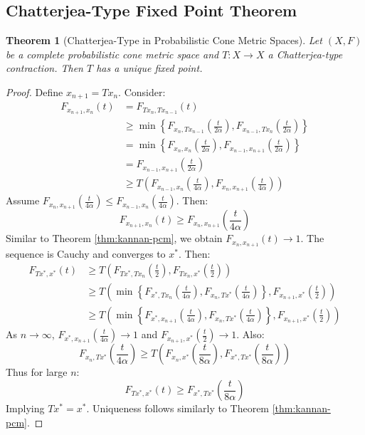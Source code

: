 \documentclass{amsart}
\newtheorem{theorem}{Theorem}[section]
\theoremstyle{definition}
\theoremstyle{remark}
\numberwithin{equation}{section}
\begin{document}
\subsection{Chatterjea-Type Fixed Point Theorem}

\begin{theorem}[Chatterjea-Type in Probabilistic Cone Metric Spaces]\label{thm:chatterjea-pcm}
Let $(X,F)$ be a complete probabilistic cone metric space and $T: X \to X$ a Chatterjea-type contraction. Then $T$ has a unique fixed point.
\end{theorem}

\begin{proof}
Define $x_{n+1} = Tx_n$. Consider:
\begin{align*}
F_{x_{n+1},x_n}(t) &= F_{Tx_n,Tx_{n-1}}(t) \\ 
&\geq \min\left\{F_{x_n,Tx_{n-1}}\left(\frac{t}{2\alpha}\right), F_{x_{n-1},Tx_n}\left(\frac{t}{2\alpha}\right)\right\} \\
&= \min\left\{F_{x_n,x_n}\left(\frac{t}{2\alpha}\right), F_{x_{n-1},x_{n+1}}\left(\frac{t}{2\alpha}\right)\right\} \\
&= F_{x_{n-1},x_{n+1}}\left(\frac{t}{2\alpha}\right) \\
&\geq T\left(F_{x_{n-1},x_n}\left(\frac{t}{4\alpha}\right), F_{x_n,x_{n+1}}\left(\frac{t}{4\alpha}\right)\right)
\end{align*}
Assume $F_{x_n,x_{n+1}}\left(\frac{t}{4\alpha}\right) \leq F_{x_{n-1},x_n}\left(\frac{t}{4\alpha}\right)$. Then:
\[
F_{x_{n+1},x_n}(t) \geq F_{x_n,x_{n+1}}\left(\frac{t}{4\alpha}\right)
\]
Similar to Theorem \ref{thm:kannan-pcm}, we obtain $F_{x_n,x_{n+1}}(t) \to 1$. The sequence is Cauchy and converges to $x^*$. Then:
\begin{align*}
F_{Tx^*,x^*}(t) &\geq T\left(F_{Tx^*,Tx_n}\left(\frac{t}{2}\right), F_{Tx_n,x^*}\left(\frac{t}{2}\right)\right) \\
&\geq T\left(\min\left\{F_{x^*,Tx_n}\left(\frac{t}{4\alpha}\right), F_{x_n,Tx^*}\left(\frac{t}{4\alpha}\right)\right\}, F_{x_{n+1},x^*}\left(\frac{t}{2}\right)\right) \\
&\geq T\left(\min\left\{F_{x^*,x_{n+1}}\left(\frac{t}{4\alpha}\right), F_{x_n,Tx^*}\left(\frac{t}{4\alpha}\right)\right\}, F_{x_{n+1},x^*}\left(\frac{t}{2}\right)\right)
\end{align*}
As $n \to \infty$, $F_{x^*,x_{n+1}}\left(\frac{t}{4\alpha}\right) \to 1$ and $F_{x_{n+1},x^*}\left(\frac{t}{2}\right) \to 1$. Also:
\[
F_{x_n,Tx^*}\left(\frac{t}{4\alpha}\right) \geq T\left(F_{x_n,x^*}\left(\frac{t}{8\alpha}\right), F_{x^*,Tx^*}\left(\frac{t}{8\alpha}\right)\right)
\]
Thus for large $n$:
\[
F_{Tx^*,x^*}(t) \geq F_{x^*,Tx^*}\left(\frac{t}{8\alpha}\right)
\]
Implying $Tx^* = x^*$. Uniqueness follows similarly to Theorem \ref{thm:kannan-pcm}.
\end{proof}
\end{document}
